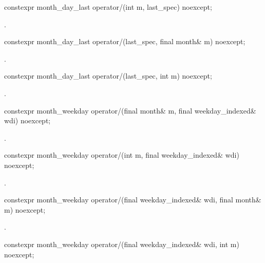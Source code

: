 \begin{itemdecl}
constexpr month_day_last
  operator/(int m, last_spec) noexcept;
\end{itemdecl}

\begin{itemdescr}
\pnum
\returns {}.
\end{itemdescr}

\begin{itemdecl}
constexpr month_day_last
  operator/(last_spec, final month& m) noexcept;
\end{itemdecl}

\begin{itemdescr}
\pnum
\returns {}.
\end{itemdescr}

\begin{itemdecl}
constexpr month_day_last
  operator/(last_spec, int m) noexcept;
\end{itemdecl}

\begin{itemdescr}
\pnum
\returns {}.
\end{itemdescr}

\begin{itemdecl}
constexpr month_weekday
  operator/(final month& m, final weekday_indexed& wdi) noexcept;
\end{itemdecl}

\begin{itemdescr}
\pnum
\returns {}.
\end{itemdescr}

\begin{itemdecl}
constexpr month_weekday
  operator/(int m, final weekday_indexed& wdi) noexcept;
\end{itemdecl}

\begin{itemdescr}
\pnum
\returns {}.
\end{itemdescr}

\begin{itemdecl}
constexpr month_weekday
  operator/(final weekday_indexed& wdi, final month& m) noexcept;
\end{itemdecl}

\begin{itemdescr}
\pnum
\returns {}.
\end{itemdescr}

\begin{itemdecl}
constexpr month_weekday
  operator/(final weekday_indexed& wdi, int m) noexcept;
\end{itemdecl}

